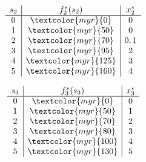 \documentclass{report}
\begin{document}
    \begin{figure}[!htb]
    \centering
    \begin{minipage}{0.40\textwidth}
        \centering %
        \[
        \begin{array}{c|c|c}
        s_2 & f_2^{*}(s_2) & x_2^{*} \\ \hline
        0 & \textcolor{myr}{0} & 0 \\ 
        1 & \textcolor{myr}{50} & 0 \\ 
        2 & \textcolor{myr}{70} & 0, 1 \\ 
        3 & \textcolor{myr}{95} & 2 \\ 
        4 & \textcolor{myr}{125} & 3 \\ 
        5 & \textcolor{myr}{160} & 4 \\ 
        \end{array}
        \]
    \end{minipage}%
    \hfill %
    \begin{minipage}{0.40\textwidth}
        \centering
        \[
        \begin{array}{c|c|c}
        s_3 & f_3^{*}(s_3) & x_3^{*} \\ \hline
        0 & \textcolor{myr}{0} & 0 \\ 
        1 & \textcolor{myr}{50} & 1 \\ 
        2 & \textcolor{myr}{70} & 2 \\ 
        3 & \textcolor{myr}{80} & 3 \\ 
        4 & \textcolor{myr}{100} & 4 \\ 
        5 & \textcolor{myr}{130} & 5 \\ 
        \end{array}
        \]
    \end{minipage}
\end{figure}
\end{document}
